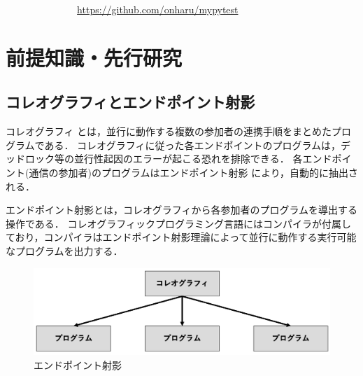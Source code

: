 \documentclass{thesis}
\begin{document}
$~~~~~~~~~~~~~~~~~~~~~~~~~~~~~~~~~$\url{https://github.com/onharu/mypytest}
\chapter{前提知識・先行研究}
\section{コレオグラフィとエンドポイント射影}
コレオグラフィ \cite{Choreographic}とは，並行に動作する複数の参加者の連携手順をまとめたプログラムである．
コレオグラフィに従った各エンドポイントのプログラムは，デッドロック等の並行性起因のエラーが起こる恐れを排除できる．
各エンドポイント(通信の参加者)のプログラムはエンドポイント射影 \cite{endpoint}により，自動的に抽出される．

エンドポイント射影とは，コレオグラフィから各参加者のプログラムを導出する操作である．
コレオグラフィックプログラミング言語にはコンパイラが付属しており，コンパイラはエンドポイント射影理論によって並行に動作する実行可能なプログラムを出力する．

\begin{figure}[H]
  \centering
  \includegraphics[scale=0.5]{image/epp.png}
  \caption{エンドポイント射影}
\end{figure}
\end{document}
